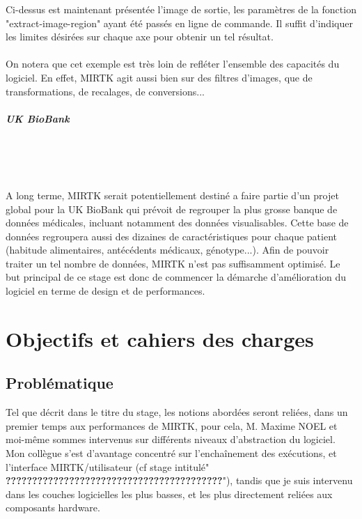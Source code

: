 \documentclass[10pt]{report}
\begin{document}
	Ci-dessus est maintenant présentée l'image de sortie, les paramètres de la fonction "extract-image-region" ayant été passés en ligne de commande. Il suffit d'indiquer les limites désirées sur chaque axe pour obtenir un tel résultat.\\
	\\
	On notera que cet exemple est très loin de refléter l'ensemble des capacités du logiciel. En effet, MIRTK agit aussi bien sur des filtres d'images, que de transformations, de recalages, de conversions... 
	 \paragraph{UK BioBank}~\par~\par
	  A long terme, MIRTK serait potentiellement destiné a faire partie d'un projet global pour la UK BioBank qui prévoit de regrouper la plus grosse banque de données médicales, incluant notamment des données visualisables. Cette base de données regroupera aussi des dizaines de caractéristiques pour chaque patient (habitude alimentaires, antécédents médicaux, génotype...). Afin de pouvoir traiter un tel nombre de données, MIRTK n'est pas suffisamment optimisé. Le but principal de ce stage est donc de commencer la démarche d'amélioration du logiciel en terme de design et de performances.
	 

\chapter{Objectifs et cahiers des charges}
	\section{Problématique} %
	Tel que décrit dans le titre du stage, les notions abordées seront reliées, dans un premier temps aux performances de MIRTK, pour cela, M. Maxime NOEL et moi-même sommes intervenus sur différents niveaux d'abstraction du logiciel. Mon collègue s'est d'avantage concentré sur l'enchaînement des exécutions, et l'interface MIRTK/utilisateur (cf stage intitulé" \textbf{?????????????????????????????????????????}"), tandis que je suis intervenu dans les couches logicielles les plus basses, et les plus directement reliées aux composants hardware. \\
	
\end{document}
